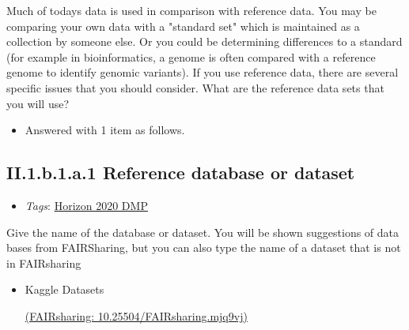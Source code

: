 \documentclass[a4paper,12pt]{report}
\begin{document}
\noindent
\begin{markdown}
Much of todays data is used in comparison with reference data. You may be comparing your own data with a "standard set" which is maintained as a collection by someone else. Or you could be determining differences to a standard (for example in bioinformatics, a genome is often compared with a reference genome to identify genomic variants). If you use reference data, there are several specific issues that you should consider. What are the reference data sets that you will use?
\end{markdown}


\begin{itemize}
  \item[\ArrowBoldDownRight] Answered with 1 item as follows.
\end{itemize}%
\subsection*{\protect\textcolor{colorSecId}{II.1.b.1.a.1} Reference database or dataset}

\label{82fd0cce-2b41-423f-92ad-636d0872045c.efc80cc8-8318-4f8c-acb7-dc1c60e491c1.2663b978-5125-4224-9930-0a50dbe895c9.fcc51962-08df-4f4c-85ad-6bb932107010.0b1610c4-5030-43a3-8a6c-c69693351a79.93988527-5bff-4125-8834-3750e9a28683}


\begin{itemize}
  \item \textit{Tags}: \ul{Horizon 2020 DMP}
  \end{itemize}


\noindent
\begin{markdown}
Give the name of the database or dataset. You will be shown suggestions of data bases from FAIRSharing, but you can also type the name of a dataset that is not in FAIRsharing
\end{markdown}



\begin{itemize}
  \item[\CheckmarkBold]
  \begin{markdown}
  Kaggle Datasets
  \end{markdown}
  \href{https://fairsharing.org/10.25504/FAIRsharing.mjq9vj}{(FAIRsharing: 10.25504/FAIRsharing.mjq9vj)}
  
\end{itemize}
\end{document}
